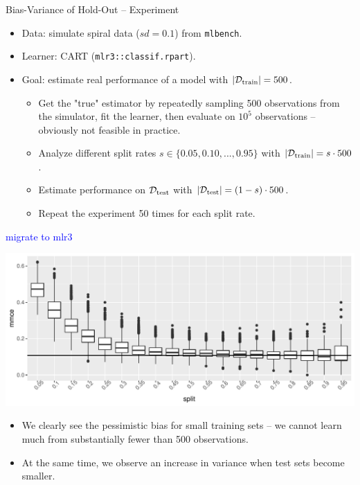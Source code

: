 \documentclass[11pt,compress,t,notes=noshow, xcolor=table]{beamer}
\begin{document}
\begin{vbframe}{Bias-Variance of Hold-Out -- Experiment}

\begin{itemize}
  \item Data: simulate spiral data ($sd = 0.1$) from \texttt{mlbench}.
  \item Learner: CART (\texttt{mlr3::classif.rpart}).
  \item Goal: estimate real performance of a model with $|\mathcal{D}_{\text{train}}| = 500$.
  \begin{itemize}
    \item Get the "true" estimator by repeatedly sampling 500 observations from 
    the simulator, fit the learner, then evaluate on $10^5$ observations -- 
    obviously not feasible in practice.
    \item Analyze different split rates $s \in \{0.05, 0.10, ..., 0.95\}$ 
    with $|\mathcal{D}_{\text{train}}| = s \cdot 500$.
    \item Estimate performance on $\mathcal{D}_{\text{test}}$ with $|\mathcal{D}_{\text{test}}| = (1 - s) \cdot 500$.
    \item Repeat the experiment 50 times for each split rate.
  \end{itemize}
\end{itemize}

\textcolor{blue}{migrate to mlr3}

\framebreak


\includegraphics[width=\textwidth]{figure/test-holdout-example} 

\lz

\begin{itemize}
  \item We clearly see the pessimistic bias for small training sets -- we cannot 
  learn much from substantially fewer than 500 observations. 
  \item At the same time, we observe an increase in variance when test sets 
  become smaller.
\end{itemize}


\end{vbframe}
\end{document}
